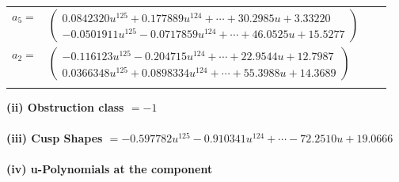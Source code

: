 \documentclass[1p]{elsarticle_modified}
\theoremstyle{definition}
\begin{document}
\begin{tabular}{m{7pt} m{180pt} m{7pt} m{180pt} }
\flushright $a_{5}=$&$\begin{pmatrix}0.0842320 u^{125}+0.177889 u^{124}+\cdots+30.2985 u+3.33220\\-0.0501911 u^{125}-0.0717859 u^{124}+\cdots+46.0525 u+15.5277\end{pmatrix}$ \\
\flushright $a_{2}=$&$\begin{pmatrix}-0.116123 u^{125}-0.204715 u^{124}+\cdots+22.9544 u+12.7987\\0.0366348 u^{125}+0.0898334 u^{124}+\cdots+55.3988 u+14.3689\end{pmatrix}$\\&\end{tabular}
\flushleft \textbf{(ii) Obstruction class $= -1$}\\~\\
\flushleft \textbf{(iii) Cusp Shapes $= -0.597782 u^{125}-0.910341 u^{124}+\cdots-72.2510 u+19.0666$}\\~\\
\newpage\renewcommand{\arraystretch}{1}
\flushleft \textbf{(iv) u-Polynomials at the component}\newline \\
\end{document}
